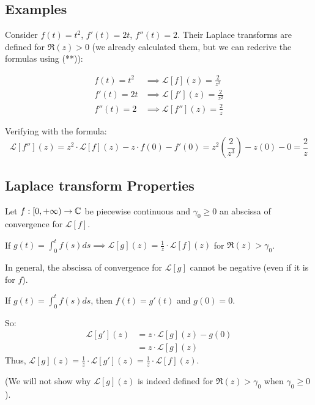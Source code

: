 \subsection{Examples}
\begin{example}[Example]
    Consider $f(t) = t^2$, $f'(t) = 2t$, $f''(t) = 2$. Their Laplace transforms are defined for $\Re(z) > 0$ (we already calculated them, but we can rederive the formulas using (**)):
    
    \begin{align*}
        f(t) = t^2 &\implies \mathcal{L}[f](z) = \frac{2}{z^3} \\
        f'(t) = 2t &\implies \mathcal{L}[f'](z) = \frac{2}{z^2} \\
        f''(t) = 2 &\implies \mathcal{L}[f''](z) = \frac{2}{z}
    \end{align*}
    
    Verifying with the formula:
    \[
        \mathcal{L}[f''](z) = z^2 \cdot \mathcal{L}[f](z) - z \cdot f(0) - f'(0) = z^2 \left(\frac{2}{z^3}\right) - z(0) - 0 = \frac{2}{z}
    \]
\end{example}
\subsection{Laplace transform Properties}
\begin{theorem}
    Let $f: [0, +\infty) \to \mathbb{C}$ be piecewise continuous and $\gamma_0 \ge 0$ an abscissa of convergence for $\mathcal{L}[f]$.
    
    If $g(t) = \int_{0}^{t} f(s) ds \implies \mathcal{L}[g](z) = \frac{1}{z} \cdot \mathcal{L}[f](z)$ for $\Re(z) > \gamma_0$.
\end{theorem}

\begin{remark}[Remark]
    In general, the abscissa of convergence for $\mathcal{L}[g]$ cannot be negative (even if it is for $f$).
\end{remark}

\begin{proofbox}
    If $g(t) = \int_{0}^{t} f(s) ds$, then $f(t) = g'(t)$ and $g(0) = 0$.
    
    So:
    \begin{align*}
        \mathcal{L}[g'](z) &= z \cdot \mathcal{L}[g](z) - g(0) \\
        &= z \cdot \mathcal{L}[g](z)
    \end{align*}
    Thus, $\mathcal{L}[g](z) = \frac{1}{z} \cdot \mathcal{L}[g'](z) = \frac{1}{z} \cdot \mathcal{L}[f](z)$.
    
    (We will not show why $\mathcal{L}[g](z)$ is indeed defined for $\Re(z) > \gamma_0$ when $\gamma_0 \ge 0$).
\end{proofbox}
